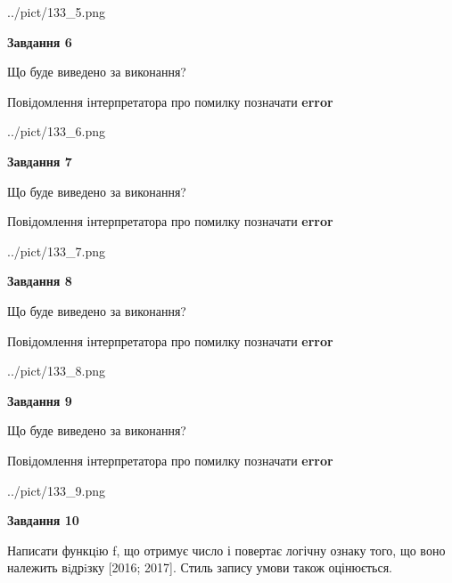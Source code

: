 \documentclass[12pt, ukrainian]{article}
\begin{document}
{\begin {large}
\begin{center}
	{../pict/133_5.png}
\end{center}
\newpage

{\begin {center}\textbf{Завдання 6}\end {center}}\par
Що буде виведено за виконання? \par
Повідомлення інтерпретатора про помилку позначати \textbf{error}

\begin{center}
	{../pict/133_6.png}
\end{center}
\newpage

{\begin {center}\textbf{Завдання 7}\end {center}}\par
Що буде виведено за виконання? \par
Повідомлення інтерпретатора про помилку позначати \textbf{error}

\begin{center}
	{../pict/133_7.png}
\end{center}
\newpage

{\begin {center}\textbf{Завдання 8}\end {center}}\par
Що буде виведено за виконання? \par
Повідомлення інтерпретатора про помилку позначати \textbf{error}

\begin{center}
	{../pict/133_8.png}
\end{center}
\newpage

{\begin {center}\textbf{Завдання 9}\end {center}}\par
Що буде виведено за виконання? \par
Повідомлення інтерпретатора про помилку позначати \textbf{error}

\begin{center}
	{../pict/133_9.png}
\end{center}
\newpage

{\begin {center}\textbf{Завдання 10}\end {center}}\par

Написати функцiю f, що отримує число і повертає логічну ознаку того, що воно належить вiдрiзку [2016; 2017]. Стиль запису умови також оцінюється.\par
\newpage

\end {large}}
\end{document}
